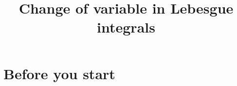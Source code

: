 \documentclass[11pt]{article}
\title{\textbf{Change of variable in Lebesgue integrals}}
\author{}
\date{}
\begin{document}
\maketitle

\section{Before you start}
\end{document}
